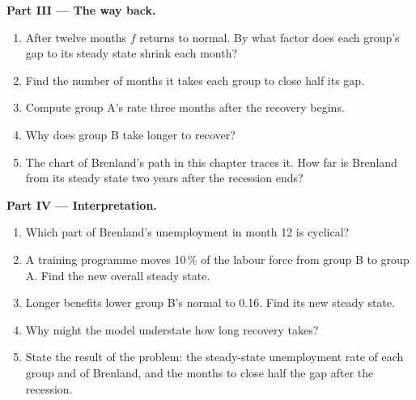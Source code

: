 \begin{problem}
\medskip
\noindent\textbf{Part III --- The way back.}
\begin{enumerate}[resume]
\item After twelve months $f$ returns to normal. By what factor does each group's gap to its steady state shrink each month?
\item Find the number of months it takes each group to close half its gap.
\item Compute group A's rate three months after the recovery begins.
\item Why does group B take longer to recover?
\item The chart of Brenland's path in this chapter traces it. How far is Brenland from its steady state two years after the recession ends?
\end{enumerate}

\medskip
\noindent\textbf{Part IV --- Interpretation.}
\begin{enumerate}[resume]
\item Which part of Brenland's unemployment in month 12 is cyclical?
\item A training programme moves 10\,\% of the labour force from group B to group A. Find the new overall steady state.
\item Longer benefits lower group B's normal  to 0.16. Find its new steady state.
\item Why might the model understate how long recovery takes?
\item State the result of the problem: the steady-state unemployment rate of each group and of Brenland, and the months to close half the gap after the recession.
\end{enumerate}
\end{problem}
